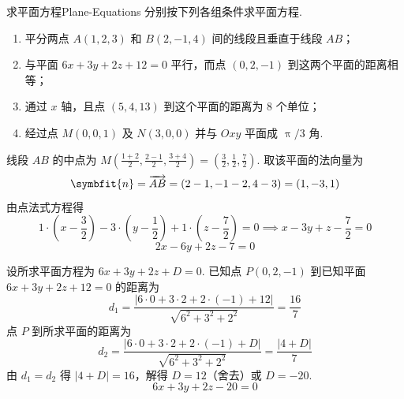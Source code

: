 \begin{problem}{求平面方程}{Plane-Equations}
    分别按下列各组条件求平面方程.
    \begin{enumerate}
        \item 平分两点 $A(1, 2, 3)$ 和 $B(2, -1, 4)$ 间的线段且垂直于线段 $AB$；
        \item 与平面 $6x + 3y + 2z + 12 = 0$ 平行，而点 $(0, 2, -1)$ 到这两个平面的距离相等；
        \item 通过 $x$ 轴，且点 $(5, 4, 13)$ 到这个平面的距离为 $8$ 个单位；
        \item 经过点 $M(0, 0, 1)$ 及 $N(3, 0, 0)$ 并与 $Oxy$ 平面成 $\uppi/3$ 角.
    \end{enumerate}
\end{problem}

\begin{solution}

    线段 $AB$ 的中点为 $M\left(\frac{1+2}{2}, \frac{2-1}{2}, \frac{3+4}{2}\right) = \left(\frac{3}{2}, \frac{1}{2}, \frac{7}{2}\right)$.
    取该平面的法向量为
    \begin{equation*}
        \symbfit{n} = \overrightarrow{AB} = (2-1, -1-2, 4-3) = (1, -3, 1)
    \end{equation*}
    由点法式方程得
    \begin{equation*}
        1 \cdot \left(x - \frac{3}{2}\right) - 3 \cdot \left(y - \frac{1}{2}\right) + 1 \cdot \left(z - \frac{7}{2}\right) = 0 \implies x - 3y + z - \frac{7}{2} = 0
    \end{equation*}
    \begin{equation*}
        \boxed{2x - 6y + 2z - 7 = 0}
    \end{equation*}


    设所求平面方程为 $6x + 3y + 2z + D = 0$.
    已知点 $P(0, 2, -1)$ 到已知平面 $6x + 3y + 2z + 12 = 0$ 的距离为
    \begin{equation*}
        d_1 = \frac{|6 \cdot 0 + 3 \cdot 2 + 2 \cdot (-1) + 12|}{\sqrt{6^2 + 3^2 + 2^2}} = \frac{16}{7}
    \end{equation*}
    点 $P$ 到所求平面的距离为
    \begin{equation*}
        d_2 = \frac{|6 \cdot 0 + 3 \cdot 2 + 2 \cdot (-1) + D|}{\sqrt{6^2 + 3^2 + 2^2}} = \frac{|4+D|}{7}
    \end{equation*}
    由 $d_1 = d_2$ 得 $|4+D| = 16$，解得 $D = 12$（舍去）或 $D = -20$.
    \begin{equation*}
        \boxed{6x + 3y + 2z - 20 = 0}
    \end{equation*}


\end{solution}
